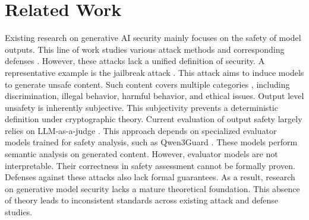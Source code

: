 \section{Related Work}

Existing research on generative AI security mainly focuses on the safety of model outputs. This line of work studies various attack methods \citep{li2024badedit, li2025one} and corresponding defenses \citep{zhang2025exploiting}. However, these attacks lack a unified definition of security. A representative example is the jailbreak attack \citep{mehrotra2024tree, zhang2025jbshield, yu2024don, wang-etal-2025-diffusionattacker}. This attack aims to induce models to generate unsafe content. Such content covers multiple categories \citep{guo2025deepseeknature}, including discrimination, illegal behavior, harmful behavior, and ethical issues. Output level unsafety is inherently subjective. This subjectivity prevents a deterministic definition under cryptographic theory. Current evaluation of output safety largely relies on LLM-as-a-judge \citep{li-etal-2025-generation}. This approach depends on specialized evaluator models trained for safety analysis, such as Qwen3Guard \citep{zhao2025qwen3guard}. These models perform semantic analysis on generated content. However, evaluator models are not interpretable. Their correctness in safety assessment cannot be formally proven. Defenses against these attacks also lack formal guarantees. As a result, research on generative model security lacks a mature theoretical foundation. This absence of theory leads to inconsistent standards across existing attack and defense studies. 
